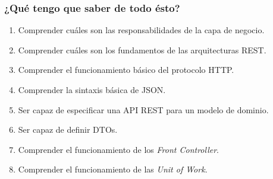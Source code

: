 \documentclass[handout,a4paper,slidestop,xcolor=pst,blue]{beamer}
\begin{document}
\begin{frame}[c]
    \frametitle{¿Qué tengo que saber de todo ésto?}
    \begin{enumerate}[<+->]
        \item Comprender cuáles son las responsabilidades de la capa de negocio.
        \item Comprender cuáles son los fundamentos de las arquitecturas REST.
        \item Comprender el funcionamiento básico del protocolo HTTP.
        \item Comprender la sintaxis básica de JSON.
        \item Ser capaz de especificar una API REST para un modelo de dominio.
        \item Ser capaz de definir DTOs.
        \item Comprender el funcionamiento de los \emph{Front Controller}.
        \item Comprender el funcionamiento de las \emph{Unit of Work}.
    \end{enumerate}
\end{frame}
\end{document}
